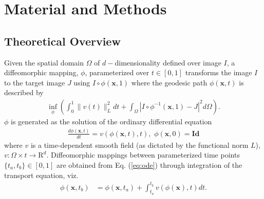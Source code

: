 \documentclass{frontiersSCNS}
\begin{document}
\section{Material and Methods}

\subsection{Theoretical Overview}

Given the spatial domain $\Omega$ of $d-$dimensionality
defined over image $I$, a diffeomorphic
mapping, $\phi$, parameterized over $t \in [0,1]$ transforms the image
$I$ to the target image $J$ using $I\circ\phi(\mathbf{x},1)$ where the
geodesic path $\phi(\mathbf{x},t)$ is described by \citep{beg2005}
\begin{align}
  \inf_{\phi} \left( \int_0^1 \|v(t)\|_L^2 dt +
                     \int_{\Omega} | I \circ \phi^{-1}(\mathbf{x},1) - J |^2 d\Omega
              \right).
  \label{eq:lddmm}
\end{align}
$\phi$ is generated as the solution of the ordinary differential equation
\begin{align}
  \frac{d \phi(\mathbf{x},t)}{dt} = v( \phi(\mathbf{x},t), t ),\,\, \phi(\mathbf{x},0) = \mathbf{Id}
\label{eq:ode}
\end{align}
where $v$ is a time-dependent smooth field (as dictated by the functional norm $L$), $v : \Omega \times t
\rightarrow \mathrm{R}^d$.  Diffeomorphic mappings
between parameterized time points $\{t_a,t_b\} \in [0,1]$
are obtained from  Eq. (\ref{eq:ode}) through integration of the transport
equation, viz.
\begin{align}
  \label{eq:integral}
\phi(\mathbf{x},t_b) &= \phi(\mathbf{x},t_a) + \int_{t_a}^{t_b} v(\phi(\mathbf{x}), t) dt.
\end{align}
\end{document}
